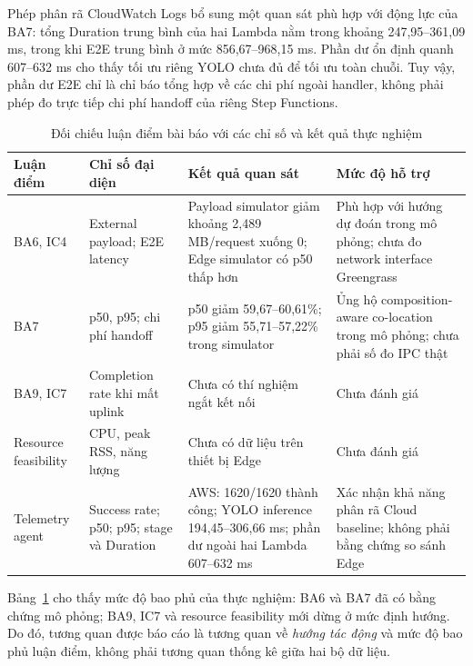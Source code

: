Phép phân rã CloudWatch Logs bổ sung một quan sát phù hợp với động lực của BA7:
tổng Duration trung bình của hai Lambda nằm trong khoảng 247,95--361,09 ms, trong
khi E2E trung bình ở mức 856,67--968,15 ms. Phần dư ổn định quanh 607--632 ms cho
thấy tối ưu riêng YOLO chưa đủ để tối ưu toàn chuỗi. Tuy vậy, phần dư E2E chỉ
là chỉ báo tổng hợp về các chi phí ngoài handler, không phải phép đo trực tiếp chi
phí handoff của riêng Step Functions.

\begin{table}[htbp]
    \centering
    \caption{Đối chiếu luận điểm bài báo với các chỉ số và kết quả thực nghiệm}
    \label{tab:paper-result-correlation}
    \begin{tabular}{|p{2.1cm}|p{3.2cm}|p{4.2cm}|p{4.1cm}|}
        \hline
        \textbf{Luận điểm} & \textbf{Chỉ số đại diện} & \textbf{Kết quả quan sát}
        & \textbf{Mức độ hỗ trợ} \\ \hline

        BA6, IC4 & External payload; E2E latency & Payload simulator giảm khoảng
        2,489 MB/request xuống 0; Edge simulator có p50 thấp hơn & Phù hợp với hướng
        dự đoán trong mô phỏng; chưa đo network interface Greengrass \\ \hline

        BA7 & p50, p95; chi phí handoff & p50 giảm 59,67--60,61\%; p95 giảm
        55,71--57,22\%
        trong simulator & Ủng hộ composition-aware co-location trong mô phỏng;
        chưa phải số đo IPC thật \\ \hline

        BA9, IC7 & Completion rate khi mất uplink & Chưa có thí nghiệm ngắt kết
        nối & Chưa đánh giá \\ \hline

        Resource feasibility & CPU, peak RSS, năng lượng & Chưa có dữ liệu trên
        thiết bị Edge & Chưa đánh giá \\ \hline

        Telemetry agent & Success rate; p50; p95; stage và Duration & AWS:
        1620/1620 thành công; YOLO inference 194,45--306,66 ms; phần dư ngoài hai
        Lambda 607--632 ms & Xác nhận khả năng phân rã Cloud baseline;
        không phải bằng chứng so sánh Edge \\ \hline
    \end{tabular}
\end{table}

Bảng~\ref{tab:paper-result-correlation} cho thấy mức độ bao phủ của thực nghiệm:
BA6 và BA7 đã có bằng chứng mô phỏng; BA9, IC7 và resource feasibility mới dừng ở
mức định hướng. Do đó, tương quan được báo cáo là tương quan về \emph{hướng tác
động} và mức độ bao phủ luận điểm, không phải tương quan thống kê giữa hai bộ dữ
liệu.

